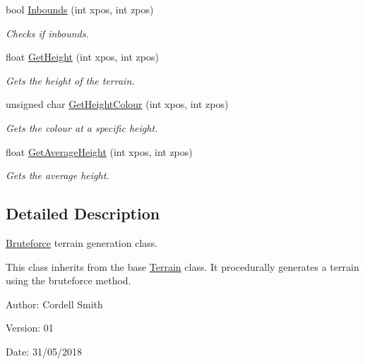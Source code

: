 \begin{CompactItemize}
bool \hyperlink{class_bruteforce_2b337f6ef80b5722a09f2e0c381923ff}{Inbounds} (int xpos, int zpos)
\begin{CompactList}\small\item\em Checks if inbounds. \item\end{CompactList}\item 
float \hyperlink{class_bruteforce_6ffaafd89058fdd7a2bdc946aa5aa24b}{GetHeight} (int xpos, int zpos)
\begin{CompactList}\small\item\em Gets the height of the terrain. \item\end{CompactList}\item 
unsigned char \hyperlink{class_bruteforce_05513f5064029203a0096d14147ad721}{GetHeightColour} (int xpos, int zpos)
\begin{CompactList}\small\item\em Gets the colour at a specific height. \item\end{CompactList}\item 
float \hyperlink{class_bruteforce_3919323bbf5e4dbcef81c4a929fb8254}{GetAverageHeight} (int xpos, int zpos)
\begin{CompactList}\small\item\em Gets the average height. \item\end{CompactList}\end{CompactItemize}


\subsection{Detailed Description}
\hyperlink{class_bruteforce}{Bruteforce} terrain generation class. 

This class inherits from the base \hyperlink{class_terrain}{Terrain} class. It procedurally generates a terrain using the bruteforce method.

\begin{Desc}
\item[Author:]Cordell Smith \end{Desc}
\begin{Desc}
\item[Version:]01 \end{Desc}
\begin{Desc}
\item[Date:]31/05/2018 \end{Desc}



